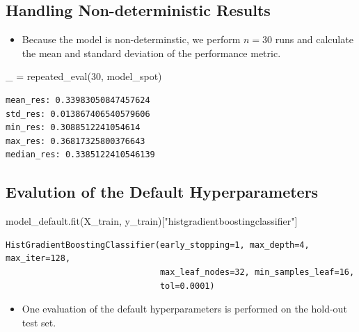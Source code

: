 \documentclass[
  letterpaper,
  DIV=11,
  numbers=noendperiod]{scrreprt}
\newenvironment{Shaded}{\begin{snugshade}}{\end{snugshade}}
\newcommand{\DecValTok}[1]{\textcolor[rgb]{0.68,0.00,0.00}{#1}}
\newcommand{\NormalTok}[1]{\textcolor[rgb]{0.00,0.23,0.31}{#1}}
\newcommand{\OperatorTok}[1]{\textcolor[rgb]{0.37,0.37,0.37}{#1}}
\newcommand{\StringTok}[1]{\textcolor[rgb]{0.13,0.47,0.30}{#1}}
\providecommand{\tightlist}{%
  \setlength{\itemsep}{0pt}\setlength{\parskip}{0pt}}\usepackage{longtable,booktabs,array}
\begin{document}
\hypertarget{handling-non-deterministic-results-1}{%
\subsection{Handling Non-deterministic
Results}\label{handling-non-deterministic-results-1}}

\begin{itemize}
\tightlist
\item
  Because the model is non-determinstic, we perform \(n=30\) runs and
  calculate the mean and standard deviation of the performance metric.
\end{itemize}

\begin{Shaded}
\begin{Highlighting}[]
\NormalTok{\_ }\OperatorTok{=}\NormalTok{ repeated\_eval(}\DecValTok{30}\NormalTok{, model\_spot)}
\end{Highlighting}
\end{Shaded}

\begin{verbatim}
mean_res: 0.33983050847457624
std_res: 0.013867406540579606
min_res: 0.3088512241054614
max_res: 0.36817325800376643
median_res: 0.3385122410546139
\end{verbatim}

\hypertarget{evalution-of-the-default-hyperparameters-1}{%
\subsection{Evalution of the Default
Hyperparameters}\label{evalution-of-the-default-hyperparameters-1}}

\begin{Shaded}
\begin{Highlighting}[]
\NormalTok{model\_default.fit(X\_train, y\_train)[}\StringTok{"histgradientboostingclassifier"}\NormalTok{]}
\end{Highlighting}
\end{Shaded}

\begin{verbatim}
HistGradientBoostingClassifier(early_stopping=1, max_depth=4, max_iter=128,
                               max_leaf_nodes=32, min_samples_leaf=16,
                               tol=0.0001)
\end{verbatim}

\begin{itemize}
\tightlist
\item
  One evaluation of the default hyperparameters is performed on the
  hold-out test set.
\end{itemize}
\end{document}
